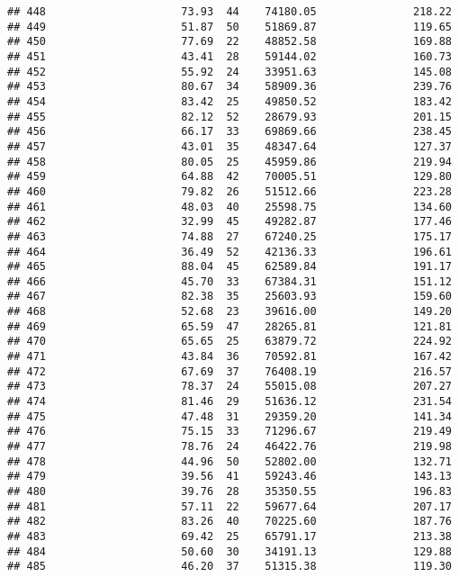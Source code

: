 \documentclass[
]{article}
\begin{document}
\begin{verbatim}
## 448                     73.93  44    74180.05               218.22
## 449                     51.87  50    51869.87               119.65
## 450                     77.69  22    48852.58               169.88
## 451                     43.41  28    59144.02               160.73
## 452                     55.92  24    33951.63               145.08
## 453                     80.67  34    58909.36               239.76
## 454                     83.42  25    49850.52               183.42
## 455                     82.12  52    28679.93               201.15
## 456                     66.17  33    69869.66               238.45
## 457                     43.01  35    48347.64               127.37
## 458                     80.05  25    45959.86               219.94
## 459                     64.88  42    70005.51               129.80
## 460                     79.82  26    51512.66               223.28
## 461                     48.03  40    25598.75               134.60
## 462                     32.99  45    49282.87               177.46
## 463                     74.88  27    67240.25               175.17
## 464                     36.49  52    42136.33               196.61
## 465                     88.04  45    62589.84               191.17
## 466                     45.70  33    67384.31               151.12
## 467                     82.38  35    25603.93               159.60
## 468                     52.68  23    39616.00               149.20
## 469                     65.59  47    28265.81               121.81
## 470                     65.65  25    63879.72               224.92
## 471                     43.84  36    70592.81               167.42
## 472                     67.69  37    76408.19               216.57
## 473                     78.37  24    55015.08               207.27
## 474                     81.46  29    51636.12               231.54
## 475                     47.48  31    29359.20               141.34
## 476                     75.15  33    71296.67               219.49
## 477                     78.76  24    46422.76               219.98
## 478                     44.96  50    52802.00               132.71
## 479                     39.56  41    59243.46               143.13
## 480                     39.76  28    35350.55               196.83
## 481                     57.11  22    59677.64               207.17
## 482                     83.26  40    70225.60               187.76
## 483                     69.42  25    65791.17               213.38
## 484                     50.60  30    34191.13               129.88
## 485                     46.20  37    51315.38               119.30

\end{verbatim}
\end{document}
